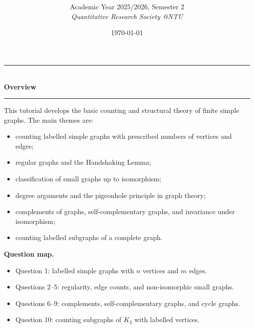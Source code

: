\documentclass[12pt]{article}
\title{
\CourseCode \CourseName \\[0.3em]
\large \DocType
}
\author{
  Academic Year 2025/2026, Semester 2 \\[0.25em]
  \textit{Quantitative Research Society @NTU}
}
\date{\today}
\begin{document}
\maketitle
\thispagestyle{plainfirst}
\pagestyle{main}

\begin{center}
  \rule{0.82\textwidth}{0.4pt}\\[4pt]
  \textbf{Overview}\\[2pt]
  \rule{0.82\textwidth}{0.4pt}
\end{center}

\noindent
This tutorial develops the basic counting and structural theory of finite simple graphs. The main themes are:
\begin{itemize}[leftmargin=*]
  \item counting labelled simple graphs with prescribed numbers of vertices and edges;
  \item regular graphs and the Handshaking Lemma;
  \item classification of small graphs up to isomorphism;
  \item degree arguments and the pigeonhole principle in graph theory;
  \item complements of graphs, self-complementary graphs, and invariance under isomorphism;
  \item counting labelled subgraphs of a complete graph.
\end{itemize}

\noindent
\textbf{Question map.}
\begin{itemize}[leftmargin=*]
  \item Question 1: labelled simple graphs with \(n\) vertices and \(m\) edges.
  \item Questions 2--5: regularity, edge counts, and non-isomorphic small graphs.
  \item Questions 6--9: complements, self-complementary graphs, and cycle graphs.
  \item Question 10: counting subgraphs of \(K_3\) with labelled vertices.
\end{itemize}

\newpage
\tableofcontents
\newpage

\end{document}
